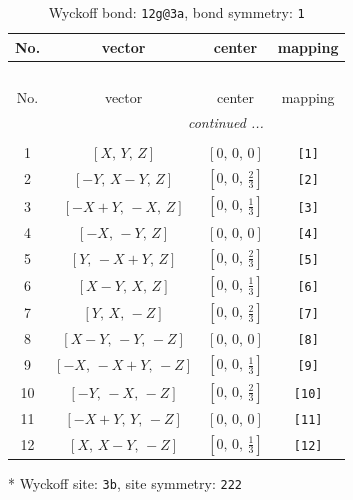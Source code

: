 \documentclass[fleqn,8pt]{jsarticle}
\begin{document}
\begin{longtable}{cccc}
\caption{Wyckoff bond: {\tt 12g@3a}, bond symmetry: {\tt 1}}
 \\
 \hline \hline
No. & vector & center & mapping \\ \hline \endfirsthead

\multicolumn{3}{l}{\tablename\ \thetable{}} \\
 \hline \hline
No. & vector & center & mapping \\ \hline \endhead

 \hline \hline
\multicolumn{3}{r}{\footnotesize\it continued ...} \\ \endfoot

 \hline \hline
\multicolumn{3}{r}{} \\ \endlastfoot

1 & $\left[ X,\, Y,\, Z \right]$ & $\left[ 0,\, 0,\, 0 \right]$ & {\tt [1]} \\ \hline
2 & $\left[ - Y,\, X - Y,\, Z \right]$ & $\left[ 0,\, 0,\, \frac{2}{3} \right]$ & {\tt [2]} \\ \hline
3 & $\left[ - X + Y,\, - X,\, Z \right]$ & $\left[ 0,\, 0,\, \frac{1}{3} \right]$ & {\tt [3]} \\ \hline
4 & $\left[ - X,\, - Y,\, Z \right]$ & $\left[ 0,\, 0,\, 0 \right]$ & {\tt [4]} \\ \hline
5 & $\left[ Y,\, - X + Y,\, Z \right]$ & $\left[ 0,\, 0,\, \frac{2}{3} \right]$ & {\tt [5]} \\ \hline
6 & $\left[ X - Y,\, X,\, Z \right]$ & $\left[ 0,\, 0,\, \frac{1}{3} \right]$ & {\tt [6]} \\ \hline
7 & $\left[ Y,\, X,\, - Z \right]$ & $\left[ 0,\, 0,\, \frac{2}{3} \right]$ & {\tt [7]} \\ \hline
8 & $\left[ X - Y,\, - Y,\, - Z \right]$ & $\left[ 0,\, 0,\, 0 \right]$ & {\tt [8]} \\ \hline
9 & $\left[ - X,\, - X + Y,\, - Z \right]$ & $\left[ 0,\, 0,\, \frac{1}{3} \right]$ & {\tt [9]} \\ \hline
10 & $\left[ - Y,\, - X,\, - Z \right]$ & $\left[ 0,\, 0,\, \frac{2}{3} \right]$ & {\tt [10]} \\ \hline
11 & $\left[ - X + Y,\, Y,\, - Z \right]$ & $\left[ 0,\, 0,\, 0 \right]$ & {\tt [11]} \\ \hline
12 & $\left[ X,\, X - Y,\, - Z \right]$ & $\left[ 0,\, 0,\, \frac{1}{3} \right]$ & {\tt [12]} \\
\end{longtable}
* Wyckoff site: {\tt 3b}, site symmetry: {\tt 222}
\end{document}
